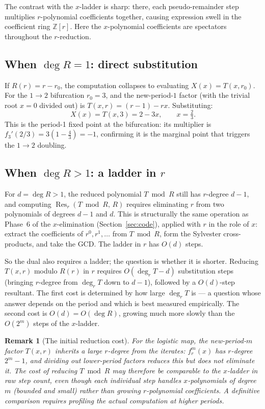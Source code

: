\documentclass[11pt]{article}
\newtheorem{remark}{Remark}
\begin{document}
The contrast with the $x$-ladder is sharp: there, each pseudo-remainder step
multiplies $r$-polynomial coefficients together, causing expression swell in the
coefficient ring $\mathbb{Z}[r]$.  Here the $x$-polynomial coefficients are
spectators throughout the $r$-reduction.

\subsection{When $\deg R = 1$: direct substitution}

If $R(r) = r-r_0$, the computation collapses to evaluating $X(x) = T(x,r_0)$.
For the $1\to2$ bifurcation $r_0=3$, and the new-period-$1$ factor (with the
trivial root $x=0$ divided out) is $T(x,r)=(r-1)-rx$.  Substituting:
\[
X(x) = T(x,3) = 2-3x, \qquad x = \tfrac{2}{3}.
\]
This is the period-1 fixed point at the bifurcation: its multiplier is
$f_3'(2/3) = 3(1-\frac{4}{3}) = -1$, confirming it is the marginal point that
triggers the $1\to2$ doubling.

\subsection{When $\deg R > 1$: a ladder in $r$}
\label{sec:dual-ladder}

For $d = \deg R > 1$, the reduced polynomial $T \bmod R$ still has $r$-degree
$d-1$, and computing $\operatorname{Res}_r(T\bmod R,\,R)$ requires eliminating
$r$ from two polynomials of degrees $d-1$ and $d$.  This is structurally the
same operation as Phase~6 of the $x$-elimination (Section~\ref{sec:code}),
applied with $r$ in the role of $x$: extract the coefficients of $r^0,
r^1,\ldots$ from $T\bmod R$, form the Sylvester cross-products, and take the
GCD.  The ladder in $r$ has $O(d)$ steps.

So the dual also requires a ladder; the question is whether it is shorter.
Reducing $T(x,r)$ modulo $R(r)$ in $r$ requires $O(\deg_r T - d)$ substitution
steps (bringing $r$-degree from $\deg_r T$ down to $d-1$), followed by a
$O(d)$-step resultant.  The first cost is determined by how large $\deg_r T$ is
--- a question whose answer depends on the period and which is best measured
empirically.  The second cost is $O(d) = O(\deg R)$, growing much more slowly
than the $O(2^m)$ steps of the $x$-ladder.

\begin{remark}[The initial reduction cost]
For the logistic map, the new-period-$m$ factor $T(x,r)$ inherits a large
$r$-degree from the iterates: $f_r^m(x)$ has $r$-degree $2^m-1$, and dividing
out lower-period factors reduces this but does not eliminate it.  The cost of
reducing $T \bmod R$ may therefore be comparable to the $x$-ladder in raw step
count, even though each individual step handles $x$-polynomials of degree $m$
(bounded and small) rather than growing $r$-polynomial coefficients.  A definitive
comparison requires profiling the actual computation at higher periods.
\end{remark}
\end{document}
